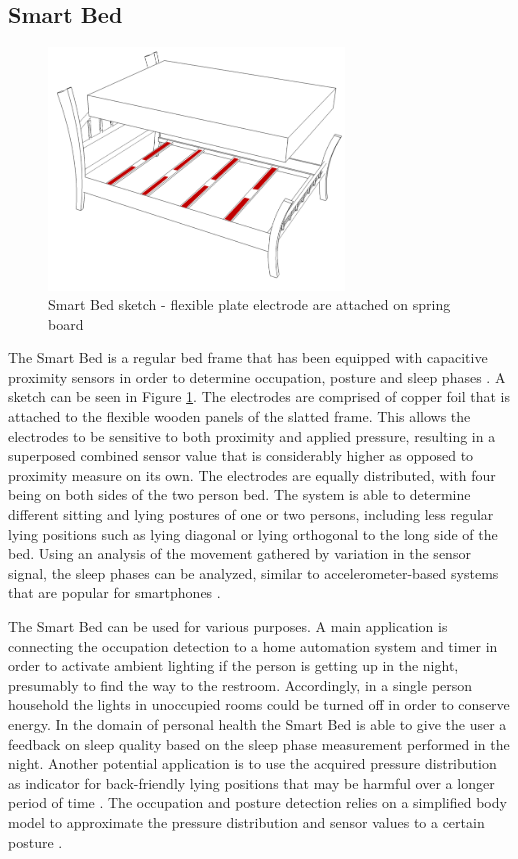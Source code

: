 \subsection{Smart Bed}
\label{ch:prot_smartbed}
\begin{figure}[h]
\centering
\includegraphics[width=0.7\textwidth]{images/smartbed}
\caption{Smart Bed sketch - flexible plate electrode are attached on spring board}
\label{fig:smartbed_sketch}
\end{figure}

The Smart Bed is a regular bed frame that has been equipped with capacitive proximity sensors in order to determine occupation, posture and sleep phases \cite{braun2012context}\cite{Djakow2013movibed}. A sketch can be seen in Figure \ref{fig:smartbed_sketch}. The electrodes are comprised of copper foil that is attached to the flexible wooden panels of the slatted frame. This allows the electrodes to be sensitive to both proximity and applied pressure, resulting in a superposed combined sensor value that is considerably higher as opposed to proximity measure on its own. The electrodes are equally distributed, with four being on both sides of the two person bed. The system is able to determine different sitting and lying postures of one or two persons, including less regular lying positions such as lying diagonal or lying orthogonal to the long side of the bed. Using an analysis of the movement gathered by variation in the sensor signal, the sleep phases can be analyzed, similar to accelerometer-based systems that are popular for smartphones \cite{krejcar2011}.

The Smart Bed can be used for various purposes. A main application is connecting the occupation detection to a home automation system and timer in order to activate ambient lighting if the person is getting up in the night, presumably to find the way to the restroom. Accordingly, in a single person household the lights in unoccupied rooms could be turned off in order to conserve energy. In the domain of personal health the Smart Bed is able to give the user a feedback on sleep quality based on the sleep phase measurement performed in the night. Another potential application is to use the acquired pressure distribution as indicator for back-friendly lying positions that may be harmful over a longer period of time \cite{Hamisu2010}.
The occupation and posture detection relies on a simplified body model to approximate the pressure distribution and sensor values to a certain posture \cite{braun2012context}.  

